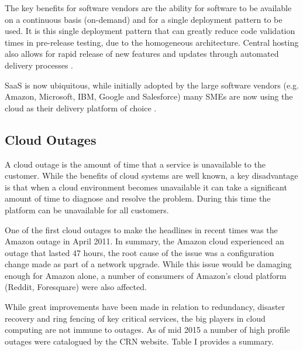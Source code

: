 The key benefits for software vendors are the ability for software to be available on a continuous basis (on-demand) and for a single deployment pattern to be used. It is this single deployment pattern that can greatly reduce code validation times in pre-release testing, due to the homogeneous architecture. Central hosting also allows for rapid release of new features and updates through automated delivery processes \cite{datacentre2015}. \par

SaaS is now ubiquitous, while initially adopted by the large software vendors (e.g. Amazon, Microsoft, IBM, Google and Salesforce) many SMEs are now using the cloud as their delivery platform of choice \cite{CRN2015providers}. \par

\subsection{Cloud Outages}
A cloud outage is the amount of time that a service is unavailable to the customer. While the benefits of cloud systems are well known, a key disadvantage is that when a cloud environment becomes unavailable it can take a significant amount of time to diagnose and resolve the problem. During this time the platform can be unavailable for all customers. \par

One of the first cloud outages to make the headlines in recent times was the Amazon outage in April 2011. In summary, the Amazon cloud experienced an outage that lasted 47 hours, the root cause of the issue was a configuration change made as part of a network upgrade. While this issue would be damaging enough for Amazon alone, a number of consumers of Amazon's cloud platform (Reddit, Foresquare) were also affected. \cite{InfoWorld2015outage} \par

While great improvements have been made in relation to redundancy, disaster recovery and ring fencing of key critical services, the big players in cloud computing are not immune to outages. As of mid 2015 a number of high profile outages were catalogued by the CRN website. \cite{CRN2015outage} Table I provides a summary. \par

